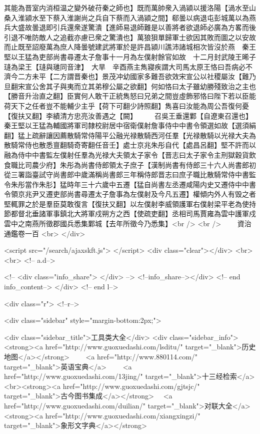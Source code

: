 其能為晋室内消桓温之變外破苻秦之師也】既而萬帥衆入渦潁以援洛陽【渦水至山桑入淮潁水至下蔡入淮謝尚之兵自下蔡而入渦潁之間】郗曇以病退屯彭城萬以為燕兵大盛故曇退即引兵還衆遂驚潰【進師易退師難是以善將者欲退師必廣為方畧而後引退不唯防敵人之追截亦慮已衆之驚潰也】萬狼狽單歸軍士欲因其敗而圖之以安故而止既至詔廢萬為庶人降曇號建武將軍於是許昌潁川譙沛諸城相次皆沒於燕　秦王堅以王猛為吏部尚書尋遷太子詹事十一月為左僕射餘官如故　十二月封武陵王晞子㻱為梁王【㻱與璡同音津】　大旱　辛酉燕主雋寢疾謂大司馬太原王恪曰吾病必不濟今二方未平【二方謂晋秦也】景茂冲幼國家多難吾欲效宋宣公以社稷屬汝【難乃旦翻宋宣公舍其子與夷而立其弟穆公屬之欲翻】何如恪曰太子雖幼勝殘致治之主也【勝音升治直之翻】臣實何人敢干正統雋怒曰兄弟之間豈虛飾邪恪曰陛下若以臣能荷天下之任者豈不能輔少主乎【荷下可翻少詩照翻】雋喜曰汝能為周公吾復何憂【復扶又翻】李績清方忠亮汝善遇之【闕】　　　召吳王垂還鄴【自遼東召還也】　秦王堅以王猛為輔國將軍司隸校尉居中宿衛僕射詹事侍中中書令領選如故【選須絹翻】猛上疏辭讓因薦散騎常侍陽平公融光禄散騎西河任羣【光禄散騎以光禄大夫為散騎常侍也散悉亶翻騎奇寄翻任音壬】處士京兆朱彤自代【處昌呂翻】堅不許而以融為侍中中書監左僕射任羣為光禄大夫領太子家令【晋志曰太子家令主刑獄穀貨飲食職比司農少府】朱彤為尚書侍郎領太子庶子【漢制尚書有侍郎三十六人尚書郎初從三署詣臺試守尚書郎中歲滿稱尚書郎三年稱侍郎晋志曰庶子職比散騎常侍中書監令朱彤當作朱肜】猛時年三十六歲中五遷【猛自尚書左丞遷咸陽内史又遷侍中中書令領京兆尹又遷吏部尚書尋遷太子詹事為左僕射及今凡五遷】權傾内外人有毁之者堅輒罪之於是羣臣莫敢復言【復扶又翻】以左僕射李威領護軍右僕射梁平老為使持節都督北垂諸軍事鎮北大將軍戍朔方之西【使疏吏翻】丞相司馬賈雍為雲中護軍戍雲中之南燕所徵郡國兵悉集鄴城【去年所徵今乃悉集】<br />
<br />
　　資治通鑑卷一百  <br>
   </div> 

<script src="/search/ajaxskft.js"> </script>
 <div class="clear"></div>
<br>
<br>
 <!-- a.d-->

 <!--
<div class="info_share">
</div> 
-->
 <!--info_share--></div>   <!-- end info_content-->
  </div> <!-- end l-->

<div class="r">   <!--r-->



<div class="sidebar"  style="margin-bottom:2px;">

 
<div class="sidebar_title">工具类大全</div>
<div class="sidebar_info">
<strong><a href="http://www.guoxuedashi.com/lsditu/" target="_blank">历史地图</a></strong>　　
<a href="http://www.880114.com/" target="_blank">英语宝典</a>　　
<a href="http://www.guoxuedashi.com/13jing/" target="_blank">十三经检索</a>　
<br><strong><a href="http://www.guoxuedashi.com/gjtsjc/" target="_blank">古今图书集成</a></strong>　
<a href="http://www.guoxuedashi.com/duilian/" target="_blank">对联大全</a>　<strong><a href="http://www.guoxuedashi.com/xiangxingzi/" target="_blank">象形文字典</a></strong>　


